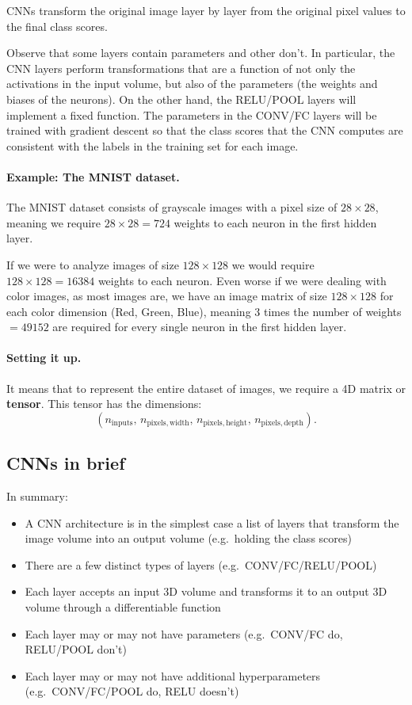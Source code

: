 \documentclass[%
oneside,                 %
final,                   %
10pt]{article}
\begin{document}
CNNs transform the original image layer by layer from the original
pixel values to the final class scores. 

Observe that some layers contain
parameters and other don’t. In particular, the CNN layers perform
transformations that are a function of not only the activations in the
input volume, but also of the parameters (the weights and biases of
the neurons). On the other hand, the RELU/POOL layers will implement a
fixed function. The parameters in the CONV/FC layers will be trained
with gradient descent so that the class scores that the CNN computes
are consistent with the labels in the training set for each image.

\paragraph{Example: The MNIST dataset.}
The MNIST dataset consists of grayscale images with a pixel size of
$28\times 28$, meaning we require $28 \times 28 = 724$ weights to each
neuron in the first hidden layer.

If we were to analyze images of size $128\times 128$ we would require
$128 \times 128 = 16384$ weights to each neuron. Even worse if we were
dealing with color images, as most images are, we have an image matrix
of size $128\times 128$ for each color dimension (Red, Green, Blue),
meaning 3 times the number of weights $= 49152$ are required for every
single neuron in the first hidden layer.

\paragraph{Setting it up.}
It means that to represent the entire
dataset of images, we require a 4D matrix or \textbf{tensor}. This tensor has the dimensions:  
\[  
(n_\mathrm{inputs},\, n_\mathrm{pixels, width},\, n_\mathrm{pixels, height},\, n_\mathrm{pixels, depth}) .
\]

\subsection{CNNs in brief}

In summary:

\begin{itemize}
\item A CNN architecture is in the simplest case a list of layers that transform the image volume into an output volume (e.g.~holding the class scores)

\item There are a few distinct types of layers (e.g.~CONV/FC/RELU/POOL)

\item Each layer accepts an input 3D volume and transforms it to an output 3D volume through a differentiable function

\item Each layer may or may not have parameters (e.g.~CONV/FC do, RELU/POOL don’t)

\item Each layer may or may not have additional hyperparameters (e.g.~CONV/FC/POOL do, RELU doesn’t)
\end{itemize}
\end{document}
